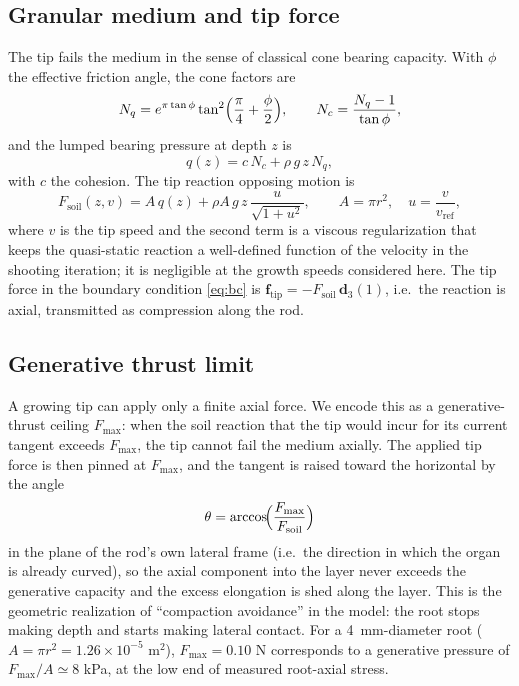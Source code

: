 \documentclass[preprint,12pt]{elsarticle}
\begin{document}
\subsection{Granular medium and tip force}
\label{sec:medium}

The tip fails the medium in the sense of classical cone bearing capacity.
With $\phi$ the effective friction angle, the cone factors are
\cite{bekker1956}
\begin{equation}
  N_q = e^{\pi\tan\phi}\tan^2\Bigl(\frac{\pi}{4}+\frac{\phi}{2}\Bigr),
  \qquad
  N_c = \frac{N_q-1}{\tan\phi},
  \label{eq:conefactors}
\end{equation}
and the lumped bearing pressure at depth $z$ is
\begin{equation}
  q(z) = c\,N_c + \rho\,g\,z\,N_q,
  \label{eq:bearing}
\end{equation}
with $c$ the cohesion. The tip reaction opposing motion is
\begin{equation}
  F_{\mathrm{soil}}(z,v) = A\,q(z) + \rho A\,g\,z\,\frac{u}{\sqrt{1+u^2}},
  \qquad A=\pi r^2,\quad u=\frac{v}{v_{\mathrm{ref}}},
  \label{eq:tipforce}
\end{equation}
where $v$ is the tip speed and the second term is a viscous regularization
that keeps the quasi-static reaction a well-defined function of the velocity
in the shooting iteration; it is negligible at the growth speeds considered
here. The tip force in the boundary condition \eqref{eq:bc} is
$\mathbf f_{\mathrm{tip}}=-F_{\mathrm{soil}}\,\mathbf d_3(1)$, i.e.\ the
reaction is axial, transmitted as compression along the rod.

\subsection{Generative thrust limit}
\label{sec:thrust}

A growing tip can apply only a finite axial force. We encode this as a
generative-thrust ceiling $F_{\max}$: when the soil reaction that the tip
would incur for its current tangent exceeds $F_{\max}$, the tip cannot fail
the medium axially. The applied tip force is then pinned at $F_{\max}$, and
the tangent is raised toward the horizontal by the angle
\begin{equation}
  \theta = \arccos\!\Bigl(\frac{F_{\max}}{F_{\mathrm{soil}}}\Bigr)
  \label{eq:thrust}
\end{equation}
in the plane of the rod's own lateral frame (i.e.\ the direction in which the
organ is already curved), so the axial component into the layer never exceeds
the generative capacity and the excess elongation is shed along the layer.
This is the geometric realization of ``compaction avoidance'' in the model:
the root stops making depth and starts making lateral contact. For a
4~mm-diameter root ($A=\pi r^2=1.26\times10^{-5}$ m$^2$), $F_{\max}=0.10$ N
corresponds to a generative pressure of
$F_{\max}/A\simeq8$ kPa, at the low end of measured root-axial stress.
\end{document}
